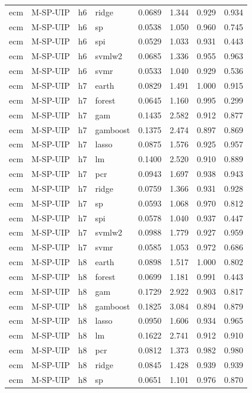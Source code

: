 \begin{ThreePartTable}
\begin{longtable}[t]{llclcccc}
ecm & M-SP-UIP & h6 & ridge & 0.0689 & 1.344 & 0.929 & 0.934\\
ecm & M-SP-UIP & h6 & sp & 0.0538 & 1.050 & 0.960 & 0.745\\
ecm & M-SP-UIP & h6 & spi & 0.0529 & 1.033 & 0.931 & 0.443\\
ecm & M-SP-UIP & h6 & svmlw2 & 0.0685 & 1.336 & 0.955 & 0.963\\
ecm & M-SP-UIP & h6 & svmr & 0.0533 & 1.040 & 0.929 & 0.536\\
\addlinespace
ecm & M-SP-UIP & h7 & earth & 0.0829 & 1.491 & 1.000 & 0.915\\
ecm & M-SP-UIP & h7 & forest & 0.0645 & 1.160 & 0.995 & 0.299\\
ecm & M-SP-UIP & h7 & gam & 0.1435 & 2.582 & 0.912 & 0.877\\
ecm & M-SP-UIP & h7 & gamboost & 0.1375 & 2.474 & 0.897 & 0.869\\
ecm & M-SP-UIP & h7 & lasso & 0.0875 & 1.576 & 0.925 & 0.957\\
ecm & M-SP-UIP & h7 & lm & 0.1400 & 2.520 & 0.910 & 0.889\\
ecm & M-SP-UIP & h7 & pcr & 0.0943 & 1.697 & 0.938 & 0.943\\
ecm & M-SP-UIP & h7 & ridge & 0.0759 & 1.366 & 0.931 & 0.928\\
ecm & M-SP-UIP & h7 & sp & 0.0593 & 1.068 & 0.970 & 0.812\\
ecm & M-SP-UIP & h7 & spi & 0.0578 & 1.040 & 0.937 & 0.447\\
ecm & M-SP-UIP & h7 & svmlw2 & 0.0988 & 1.779 & 0.927 & 0.959\\
ecm & M-SP-UIP & h7 & svmr & 0.0585 & 1.053 & 0.972 & 0.686\\
\addlinespace
ecm & M-SP-UIP & h8 & earth & 0.0898 & 1.517 & 1.000 & 0.802\\
ecm & M-SP-UIP & h8 & forest & 0.0699 & 1.181 & 0.991 & 0.443\\
ecm & M-SP-UIP & h8 & gam & 0.1729 & 2.922 & 0.903 & 0.817\\
ecm & M-SP-UIP & h8 & gamboost & 0.1825 & 3.084 & 0.894 & 0.879\\
ecm & M-SP-UIP & h8 & lasso & 0.0950 & 1.606 & 0.934 & 0.965\\
ecm & M-SP-UIP & h8 & lm & 0.1622 & 2.741 & 0.912 & 0.910\\
ecm & M-SP-UIP & h8 & pcr & 0.0812 & 1.373 & 0.982 & 0.980\\
ecm & M-SP-UIP & h8 & ridge & 0.0845 & 1.428 & 0.939 & 0.939\\
ecm & M-SP-UIP & h8 & sp & 0.0651 & 1.101 & 0.976 & 0.870\\

\end{longtable}
\end{ThreePartTable}
